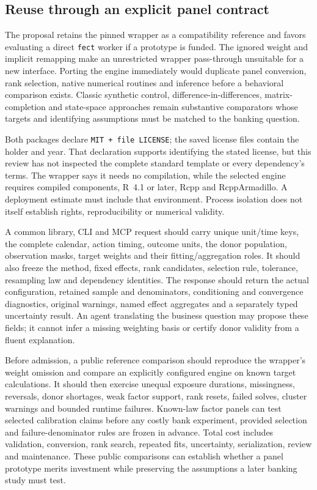 \subsection{Reuse through an explicit panel contract}
\label{exec21:gsynth-integration}

The proposal retains the pinned wrapper as a compatibility reference and
favors evaluating a direct \texttt{fect} worker if a prototype is funded.
The ignored weight and implicit remapping make an unrestricted wrapper
pass-through unsuitable for a new interface. Porting the engine immediately
would duplicate panel conversion, rank selection, native numerical routines
and inference before a behavioral comparison exists. Classic synthetic
control, difference-in-differences, matrix-completion and state-space
approaches remain substantive comparators whose targets and identifying
assumptions must be matched to the banking question.

Both packages declare \texttt{MIT + file LICENSE}; the saved license files
contain the holder and year. That declaration supports identifying the
stated license, but this review has not inspected the complete standard
template or every dependency's terms. The wrapper says it needs no
compilation, while the selected engine requires compiled components,
R~4.1 or later, Rcpp and RcppArmadillo. A deployment estimate must include
that environment. Process isolation does not itself establish rights,
reproducibility or numerical validity. \citep{exec21_gsynth_wrapper,exec21_gsynth_engine}

A common library, CLI and MCP request should carry unique unit/time keys,
the complete calendar, action timing, outcome units, the donor population,
observation masks, target weights and their fitting/aggregation roles. It
should also freeze the method, fixed effects, rank candidates, selection
rule, tolerance, resampling law and dependency identities. The response
should return the actual configuration, retained sample and denominators,
conditioning and convergence diagnostics, original warnings, named effect
aggregates and a separately typed uncertainty result. An agent translating
the business question may propose these fields; it cannot infer a missing
weighting basis or certify donor validity from a fluent explanation.

Before admission, a public reference comparison should reproduce the
wrapper's weight omission and compare an explicitly configured engine on
known target calculations. It should then exercise unequal exposure
durations, missingness, reversals, donor shortages, weak factor support,
rank resets, failed solves, cluster warnings and bounded runtime failures.
Known-law factor panels can test selected calibration claims before any
costly bank experiment, provided selection and failure-denominator rules
are frozen in advance. Total cost includes validation, conversion, rank
search, repeated fits, uncertainty, serialization, review and maintenance.
These public comparisons can establish whether a panel prototype merits
investment while preserving the assumptions a later banking study must test.
\citep{exec21_gsynth_reference}


